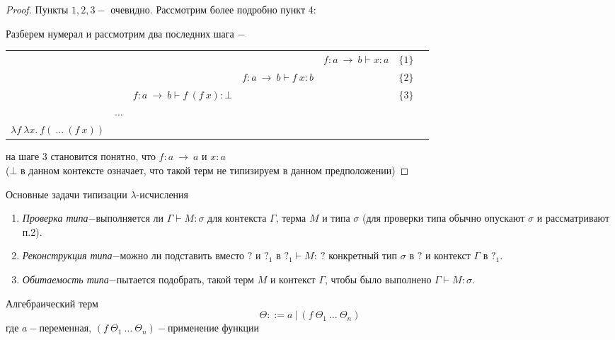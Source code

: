 	\begin{proof}
		Пункты $1, 2, 3-$ очевидно. Рассмотрим более подробно пункт 4:
		\par Разберем нумерал и рассмотрим два последних шага $-$


	\begin{table}[H]
			\begin{tabular}{ccccccc}
				&&&&\multicolumn{1}{c}{$f:a\:\rightarrow\:b  \vdash  x:a$}& $\{1\}$\\
				\cline{4-5}
				&&&\multicolumn{1}{c}{$f:a\:\rightarrow\:b  \vdash f\:x:b$}&&$\{2\}$\\
				\cline{3-4}
				&&\multicolumn{1}{c}{$f:a\:\rightarrow\:b  \vdash f\:(f\:x):\bot$}&&&$\{3\}$\\
				\cline{2-3}
				&\multicolumn{1}{c}{$\hdots$}\\
				\cline{1-2}
				\multicolumn{1}{c}{$\lambda f\:\lambda x. \:f(\:\hdots\:(f\:x))$}&&&&&&\\
			\end{tabular}
		\end{table}
		на шаге 3 становится понятно, что $f:a\:\rightarrow\:a$ и $x:a$
		\\($\bot$ в данном контексте означает, что такой терм не типизируем в данном предположении)
		\end{proof}

	\begin{statement}Основные задачи типизации $\lambda$-исчисления\end{statement}
		\begin{enumerate}
			\item \emph{Проверка типа$-$}выполняется ли $\Gamma\vdash M:\sigma$ для контекста $\Gamma\text{, терма }M\text{ и типа }\sigma$ (для проверки типа обычно опускают $\sigma$ и рассматривают п.2).
			\item \emph{Реконструкция типа$-$}можно ли подставить вместо $?$ и $?_1$ в $?_1\vdash M:\:?$ конкретный тип $\sigma$ в $?$ и контекст $\Gamma$ в $?_1$.
			\item \emph{Обитаемость типа$-$}пытается подобрать, такой терм $M$ и контекст $\Gamma$, чтобы было выполнено $\Gamma\vdash M:\sigma$.
		\end{enumerate}			
	\begin{definition}Алгебраический терм $$\Theta::=a\:|\:(f\:\Theta_1\:\ldots\:\Theta_n)$$ где $a-$переменная, $(f\:\Theta_1\:\ldots\:\Theta_n)-$применение функции \end{definition}
